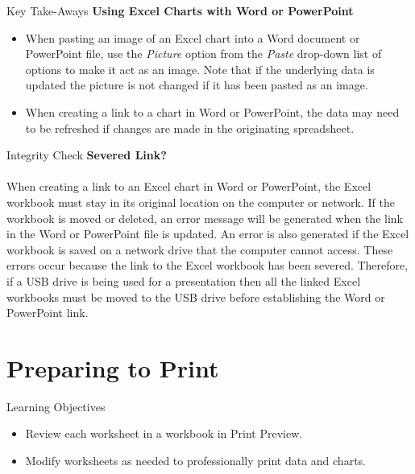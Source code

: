 \begin{center}
	\begin{tkwbox}{Key Take-Aways}
		\textbf{Using Excel Charts with Word or PowerPoint}
		\\
		\begin{itemize}
			\setlength{\itemsep}{0pt}
			\setlength{\parskip}{0pt}
			\setlength{\parsep}{0pt}

			\item When pasting an image of an Excel chart into a Word document or PowerPoint file, use the \textit{Picture} option from the \textit{Paste} drop-down list of options to make it act as an image. Note that if the underlying data is updated the picture is not changed if it has been pasted as an image.
			\item When creating a link to a chart in Word or PowerPoint, the data may need to be refreshed if changes are made in the originating spreadsheet. 
					
		\end{itemize}
	\end{tkwbox}
\end{center}

\begin{center}
	\begin{infobox}{Integrity Check}
		\textbf{Severed Link?}
		\\
		\\
		When creating a link to an Excel chart in Word or PowerPoint, the Excel workbook must stay in its original location on the computer or network. If the workbook is moved or deleted, an error message will be generated when the link in the Word or PowerPoint file is updated. An error is also generated if the Excel workbook is saved on a network drive that the computer cannot access. These errors occur because the link to the Excel workbook has been severed. Therefore, if a USB drive is being used for a presentation then all the linked Excel workbooks must be moved to the USB drive before establishing the Word or PowerPoint link.
	\end{infobox}
\end{center}

\section{Preparing to Print}

\begin{center}
	\begin{objbox}{Learning Objectives}
		\begin{itemize}
			\setlength{\itemsep}{0pt}
			\setlength{\parskip}{0pt}
			\setlength{\parsep}{0pt}

			\item Review each worksheet in a workbook in Print Preview.
			\item Modify worksheets as needed to professionally print data and charts.
			
		\end{itemize}
	\end{objbox}
\end{center}

